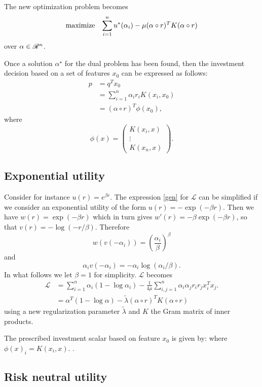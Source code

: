 \documentclass{article}
\newcommand{\lag}{\mathscr{L}}
\newcommand{\sumi}{\sum_{i=1}^n}
\newcommand{\sumij}{\sum_{i,j=1}^n}
\begin{document}
The new optimization problem becomes
\begin{align*}
  \maximizeEquation{\sumi u^*(\alpha_i) - \mu(\alpha\circ r)^TK(\alpha\circ r)}
\end{align*}
over $\alpha\in\mathscr{R}^n$.

Once a solution $\alpha^\star$ for the dual problem has been found, then the investment
decision based on a set of features $x_0$ can be expressed as follows:
\begin{align*}
  p &= q^Tx_0\\
    &= \sumi\alpha_ir_iK(x_i,x_0)\\
    &= (\alpha \circ r)^T\phi(x_0),
\end{align*}
where
\[
  \phi(x) =
  \begin{pmatrix}
    K(x_i,x)\\
    \vdots\\
    K(x_n,x)
  \end{pmatrix}.
\]


\subsection{Exponential utility}
Consider for instance $u(r) = e^{\beta r}$.
The expression \eqref{gen} for $\lag$ can be simplified if we consider an exponential
utility of the form $u(r) = -\exp(-\beta r)$. Then we have $w(r) = \exp(-\beta r)$ which
in turn gives $w'(r) = -\beta\exp(-\beta r)$, so that $v(r) =
-\log(-r/\beta)$. Therefore
\[
  w(v(-\alpha_i)) = \left(\frac{\alpha_i}{\beta}\right)^\beta
\]
and
\[
  \alpha_iv(-\alpha_i) = -\alpha_i\log(\alpha_i/\beta).
\]
In what follows we let $\beta=1$ for simplicity. $\lag$ becomes
\begin{align*}
  \lag &= \sumi\alpha_i(1-\log \alpha_i) - \frac{1}{4\mu}\sumij
         \alpha_i\alpha_jr_ir_jx_i^Tx_j.\\
       &= \alpha^T(1-\log\alpha) - \tilde\lambda(\alpha\circ r)^TK(\alpha \circ r)
\end{align*}
using a new regularization parameter $\tilde\lambda$ and $K$ the Gram matrix of inner
products.

The prescribed investment scalar based on feature $x_0$ is given by:
where $\phi(x)_i = K(x_i,x)$. .

\subsection{Risk neutral utility}
\end{document}
